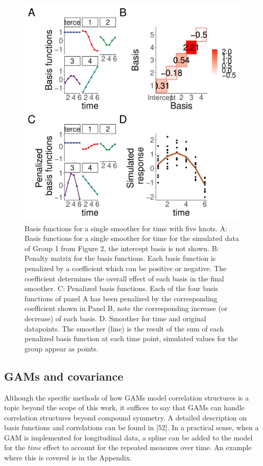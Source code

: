 \documentclass[
]{article}
\begin{document}
\begin{figure}[!h]

{\centering \includegraphics[width=0.75\linewidth,]{Manuscript_AM_v4_files/figure-latex/basis-plot-1} 

}

\caption{Basis functions for a single smoother for time with five knots. A: Basis functions for a single smoother for time for the simulated data of Group 1 from Figure 2, the intercept basis is not shown. B: Penalty matrix for the basis functions. Each basis function is penalized by a coefficient which can be positive or negative. The coefficient determines the overall effect of each basis in the final smoother. C: Penalized basis functions. Each of the four basis functions of panel A has been penalized by the corresponding coefficient shown in Panel B, note the corresponding increase (or decrease) of each basis. D. Smoother for time and original datapoints. The smoother (line) is the result of the sum of each penalized basis function at each time point, simulated values for the group appear as points.}\label{fig:basis-plot}
\end{figure}

\hypertarget{gams-and-covariance}{%
\subsection{GAMs and covariance}\label{gams-and-covariance}}

Although the specific methods of how GAMs model correlation structures is a topic beyond the scope of this work, it suffices to say that GAMs can handle correlation structures beyond compound symmetry. A detailed description on basis functions and correlations can be found in {[}52{]}. In a practical sense, when a GAM is implemented for longitudinal data, a spline can be added to the model for the \emph{time} effect to account for the repeated measures over time. An example where this is covered is in the Appendix.
\end{document}
